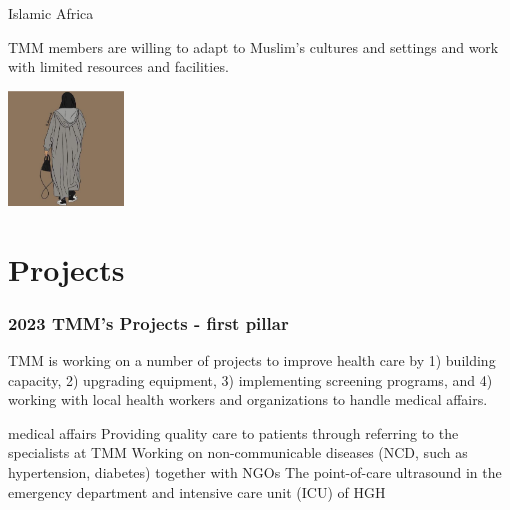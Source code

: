 \documentclass[aspectratio=169]{beamer}
\begin{document}
\begin{frame}{Islamic Africa}

\begin{outline}
    \1 TMM members are willing to adapt to Muslim's cultures and settings and work with limited resources and facilities.

\end{outline}

\begin{center}
\includegraphics[width=0.23\textwidth]{IMG_4872.jpeg}


%
%
\end{center}

\end{frame}
\section{Projects}
\begin{frame}
\frametitle{2023 TMM's Projects - first pillar}
\begin{outline}
    TMM is working on a number of projects to improve health care by 1) building capacity, 2) upgrading equipment, 3) implementing screening programs, and 4) working with local health workers and organizations to handle medical affairs.
    
    \1 medical affairs
        \2 Providing quality care to patients through referring to the specialists at TMM
        \2 Working on non-communicable diseases (NCD, such as hypertension, diabetes) together with NGOs
        \2 The point-of-care ultrasound in the emergency department and intensive care unit (ICU) of HGH

\end{outline}



\end{frame}
\end{document}
